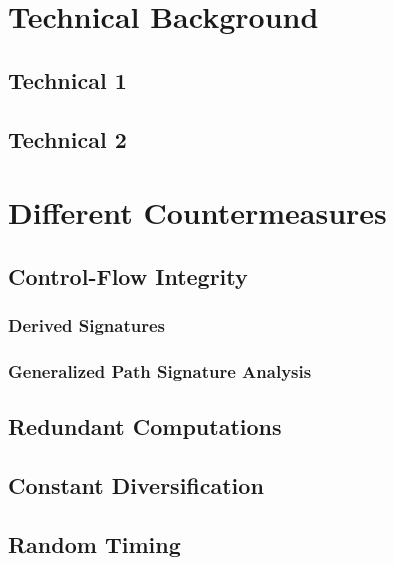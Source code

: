 \chapter{Technical Background}

\section{Technical 1}
\section{Technical 2}

\chapter{Different Countermeasures}
\section{Control-Flow Integrity}
\subsection{Derived Signatures}
\subsection{Generalized Path Signature Analysis}
\section{Redundant Computations}
\section{Constant Diversification}
\section{Random Timing}

\chapter{}



\chapter{}


\chapter{}
